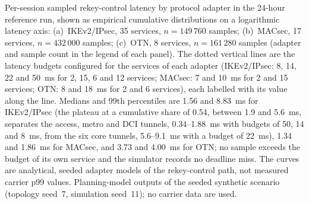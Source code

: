 Per-session sampled rekey-control latency by protocol adapter in the 24-hour
reference run, shown as empirical cumulative distributions on a logarithmic
latency axis: (a)~IKEv2/IPsec, 35 services, $n = 149\,760$ samples;
(b)~MACsec, 17 services, $n = 432\,000$ samples; (c)~OTN, 8 services,
$n = 161\,280$ samples (adapter and sample count in the legend of each
panel). The dotted vertical lines are the latency budgets configured for the
services of each adapter (IKEv2/IPsec: 8, 14, 22 and 50~ms for 2, 15, 6 and
12 services; MACsec: 7 and 10~ms for 2 and 15 services; OTN: 8 and 18~ms for
2 and 6 services), each labelled with its value along the line. Medians and
99th percentiles are 1.56 and 8.83~ms for IKEv2/IPsec (the plateau at a
cumulative share of 0.54, between 1.9 and 5.6~ms, separates the access,
metro and DCI tunnels, 0.34--1.88~ms with budgets of 50, 14 and 8~ms, from
the six core tunnels, 5.6--9.1~ms with a budget of 22~ms), 1.34 and 1.86~ms
for MACsec, and 3.73 and 4.00~ms for OTN; no sample exceeds the budget of
its own service and the simulator records no deadline miss. The curves are
analytical, seeded adapter models of the rekey-control path, not measured
carrier p99 values. Planning-model outputs of the seeded synthetic scenario
(topology seed~7, simulation seed~11); no carrier data are used.
